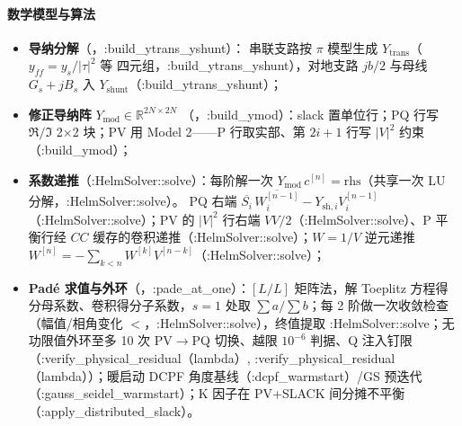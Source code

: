 \paragraph{数学模型与算法}
\begin{itemize}
  \item \textbf{导纳分解}（，:build\_ytrans\_yshunt）：
        串联支路按 $\pi$ 模型生成 $Y_{\mathrm{trans}}$（$y_{ff}=y_s/|\tau|^2$ 等
        四元组，:build\_ytrans\_yshunt），对地支路 $jb/2$ 与母线 $G_s+jB_s$ 入
        $Y_{\mathrm{shunt}}$（:build\_ytrans\_yshunt）；
  \item \textbf{修正导纳阵} $Y_{\mathrm{mod}}\in\mathbb R^{2N\times2N}$
        （，:build\_ymod）：slack 置单位行；PQ 行写
        $\Re/\Im$ 2$\times$2 块；PV 用 Model 2——P 行取实部、第 $2i{+}1$ 行写
        $|V|^2$ 约束（:build\_ymod）；
  \item \textbf{系数递推}（:HelmSolver::solve）：每阶解一次
        $Y_{\mathrm{mod}}\,c^{[n]}=\mathrm{rhs}$（共享一次 LU 分解，:HelmSolver::solve）。
        PQ 右端 $\overline{S_i}\,\overline{W_i^{[n-1]}}-Y_{\mathrm{sh},i}V_i^{[n-1]}$
        （:HelmSolver::solve）；PV 的 $|V|^2$ 行右端 $V\!V/2$（:HelmSolver::solve）、P 平衡行经
        $CC$ 缓存的卷积递推（:HelmSolver::solve）；$W=1/V$ 逆元递推
        $W^{[n]}=-\sum_{k<n}W^{[k]}V^{[n-k]}$（:HelmSolver::solve）；
  \item \textbf{Padé 求值与外环}（，:pade\_at\_one）：$[L/L]$
        矩阵法，解 Toeplitz 方程得分母系数、卷积得分子系数，$s=1$ 处取
        $\sum a/\sum b$；每 2 阶做一次收敛检查（幅值/相角变化
        $<$，:HelmSolver::solve），终值提取 :HelmSolver::solve；无功限值外环至多
        10 次 PV$\to$PQ 切换、越限 $10^{-6}$ 判据、Q 注入钉限
        （:verify\_physical\_residual（lambda）, :verify\_physical\_residual（lambda））；暖启动 DCPF 角度基线（:dcpf\_warmstart）/GS 预迭代
        （:gauss\_seidel\_warmstart）；K 因子在 PV+SLACK 间分摊不平衡（:apply\_distributed\_slack）。
\end{itemize}
